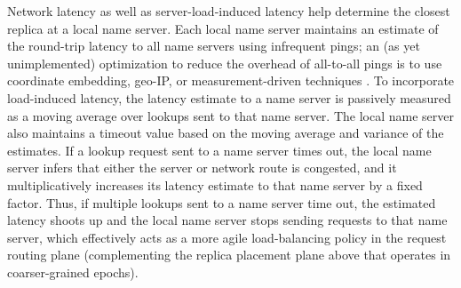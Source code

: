 

Network latency as well as server-load-induced latency help determine the closest replica at a local name server. Each local name server maintains an estimate of the round-trip latency to all name servers using infrequent pings; an (as yet unimplemented) optimization to reduce the overhead of all-to-all pings is to use coordinate embedding, geo-IP, or measurement-driven techniques \cite{iplane}. To incorporate load-induced latency, the latency estimate to a name server is passively measured as a moving average over lookups sent to that name server. The local name server also maintains a timeout value based on the moving average and variance of the estimates.  If a lookup request sent to a name server times out, the local name server infers that either the server or network route is congested, and it multiplicatively increases its latency estimate to that name server by a fixed factor. Thus,  if multiple lookups sent to a name server time out, the estimated latency shoots up and the local name server stops sending requests to that name  server, which effectively acts as a more agile load-balancing policy in the request routing plane (complementing the replica placement plane above that operates in coarser-grained epochs).


